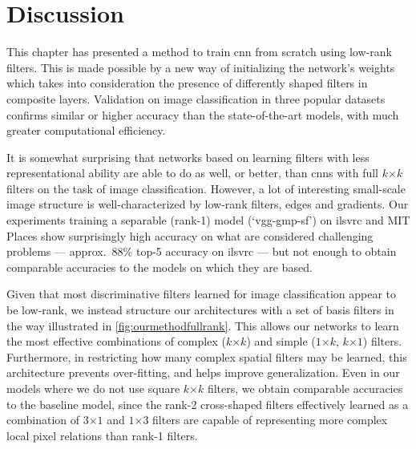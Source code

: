 \documentclass[thesis]{subfiles}
\begin{document}
    \section{Discussion}
    This chapter has presented a method to train \gls{cnn} from scratch using low-rank filters. This is made possible by a new way of initializing the network’s weights which takes into consideration the presence of differently shaped filters in composite layers. 
    Validation on image classification in three popular datasets confirms similar or higher accuracy than the state-of-the-art models, with much greater computational efficiency. 

    It is somewhat surprising that networks based on learning filters with less representational ability are able to do as well, or better, than \glspl{cnn} with full $k$$\times$$k$ filters on the task of image classification. However, a lot of interesting small-scale image structure is well-characterized by low-rank filters, \eg edges and gradients. Our experiments training a separable (rank-1) model (`vgg-gmp-sf') on \gls{ilsvrc} and MIT Places show surprisingly high accuracy on what are considered challenging problems --- approx.\ 88\% top-5 accuracy on \gls{ilsvrc} --- but not enough to obtain comparable accuracies to the models on which they are based.
    
    Given that most discriminative filters learned for image classification appear to be low-rank, we instead structure our architectures with a set of basis filters in the way illustrated in \cref{fig:ourmethodfullrank}. This allows our networks to learn the most effective combinations of complex (\eg $k$$\times$$k$) and simple (\eg $1$$\times$$k$, $k$$\times$$1$) filters. Furthermore, in restricting how many complex spatial filters may be learned, this architecture prevents over-fitting, and helps improve generalization. Even in our models where we do not use square $k$$\times$$k$ filters, we obtain comparable accuracies to the baseline model, since the rank-2 cross-shaped filters effectively learned as a combination of $3$$\times$$1$ and $1$$\times$$3$ filters are capable of representing more complex local pixel relations than rank-1 filters.
\end{document}
